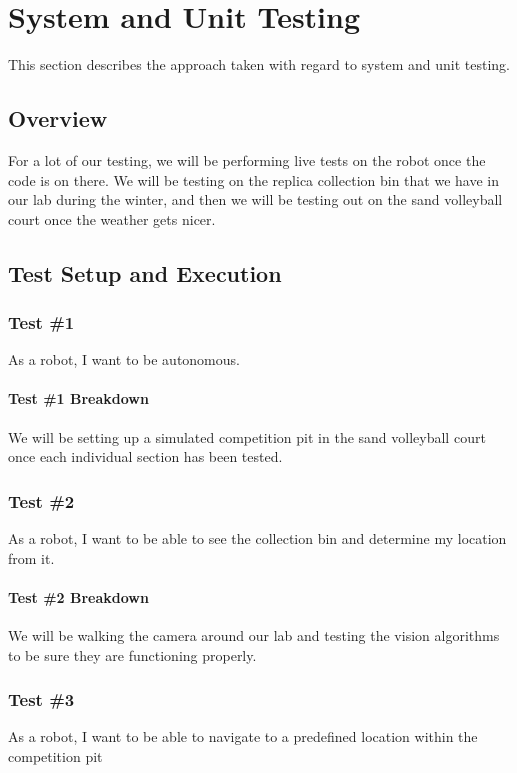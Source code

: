 
\chapter{System  and Unit Testing}

This section describes the approach taken with regard to system and unit testing. 

\section{Overview}
For a lot of our testing, we will be performing live tests on the robot once the code is on there. We will be testing on the replica collection bin that we have in our lab during the winter, and then we will be testing out on the sand volleyball court once the weather gets nicer. 



\section{Test Setup and Execution}


\subsection{Test \#1}
As a robot, I want to be autonomous.

\subsubsection{Test \#1 Breakdown}
We will be setting up a simulated competition pit in the sand volleyball court once each individual section has been tested.

\subsection{Test \#2} 
As a robot, I want to be able to see the collection bin and determine my location from it.

\subsubsection{Test \#2 Breakdown}
We will be walking the camera around our lab and testing the vision algorithms to be sure they are functioning properly.

\subsection{Test \#3} 
As a robot, I want to be able to navigate to a predefined location within the competition pit
